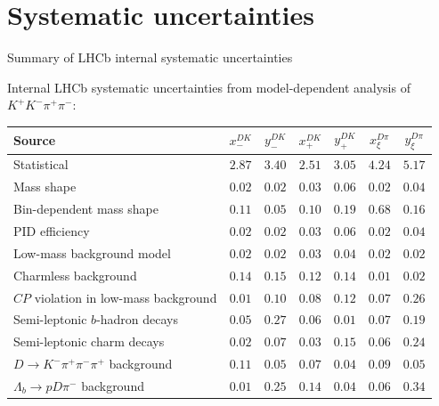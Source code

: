 \documentclass[xcolor={dvipsnames}]{beamer}
\begin{document}
\section{Systematic uncertainties}
\begin{frame}{Summary of LHCb internal systematic uncertainties}
  \begin{center}
    Internal LHCb systematic uncertainties from model-dependent analysis of $K^+K^-\pi^+\pi^-$:
  \end{center}
  \vspace{-0.3cm}
  \scriptsize
  \vspace{0.02cm}
  \begin{center}
    \begin{tabular}{lcccccc}
        \hline
        Source & $x_-^{DK}$ & $y_-^{DK}$ & $x_+^{DK}$ & $y_+^{DK}$ & $x_\xi^{D\pi}$ & $y_\xi^{D\pi}$ \\
        \hline
        Statistical                                                & $2.87$ & $3.40$ & $2.51$ & $3.05$ & $4.24$ & $5.17$ \\
        \hline
        Mass shape                                                 & $0.02$ & $0.02$ & $0.03$ & $0.06$ & $0.02$ & $0.04$ \\
        Bin-dependent mass shape                                   & $0.11$ & $0.05$ & $0.10$ & $0.19$ & $0.68$ & $0.16$ \\
        PID efficiency                                             & $0.02$ & $0.02$ & $0.03$ & $0.06$ & $0.02$ & $0.04$ \\
        Low-mass background model                                  & $0.02$ & $0.02$ & $0.03$ & $0.04$ & $0.02$ & $0.02$ \\
        Charmless background                                       & $0.14$ & $0.15$ & $0.12$ & $0.14$ & $0.01$ & $0.02$ \\
        $C\!P$ violation in low-mass background                    & $0.01$ & $0.10$ & $0.08$ & $0.12$ & $0.07$ & $0.26$ \\
        Semi-leptonic $b$-hadron decays                            & $0.05$ & $0.27$ & $0.06$ & $0.01$ & $0.07$ & $0.19$ \\
        Semi-leptonic charm decays                                 & $0.02$ & $0.07$ & $0.03$ & $0.15$ & $0.06$ & $0.24$ \\
        $D\to K^-\pi^+\pi^-\pi^+$ background                       & $0.11$ & $0.05$ & $0.07$ & $0.04$ & $0.09$ & $0.05$ \\
        $\Lambda_b\to pD\pi^-$ background                          & $0.01$ & $0.25$ & $0.14$ & $0.04$ & $0.06$ & $0.34$ \\

\end{tabular}
\end{center}
\end{frame}
\end{document}

